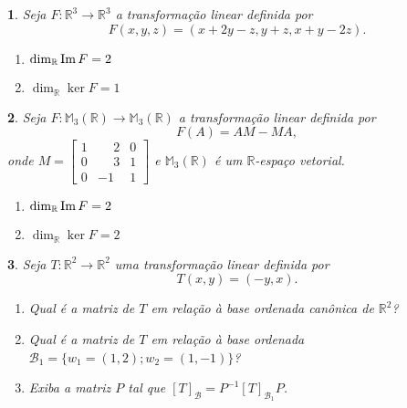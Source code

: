 \documentclass[12pt]{exam}
\newtheorem{exercicio}{}
\newcommand{\im}{{\rm Im\,}}
\newcommand{\real}{\mathbb{R}}
\newcommand{\cp}[1]{\mathbb{#1}}
\begin{document}
\begin{exercicio}
  Seja $F : \real^3 \to \real^3$ a transforma\c{c}\~ao linear definida por
  \[
    F(x,y,z) = (x + 2y - z, y + z, x + y - 2z).
  \]
  \begin{solucao}
    \begin{enumerate}[label=({\alph*})]
      \item $\dim_\real\im F = 2$
      \item $\dim_\real\ker F = 1$
    \end{enumerate}
  \end{solucao}
\end{exercicio}

\begin{exercicio}
  Seja $F : \cp{M}_3(\real) \to \cp{M}_3(\real)$ a transforma\c{c}\~ao linear definida por
  \[
    F(A) = AM - MA,
  \]
  onde $M = \begin{bmatrix}
    1 & \phantom{-}2 & 0\\0 & \phantom{-}3 & 1\\0 & -1 & 1
  \end{bmatrix}$ e $\cp{M}_3(\real)$ \'e um $\real$-espa\c{c}o vetorial.
  \begin{solucao}
    \begin{enumerate}[label=({\alph*})]
      \item $\dim_\real\im F = 2$
      \item $\dim_\real\ker F = 2$
    \end{enumerate}
  \end{solucao}
\end{exercicio}

\begin{exercicio}
  Seja $T : \real^2 \to \real^2$ uma transforma\c{c}\~ao linear definida por
  \[
    T(x,y) = (-y,x).
  \]
  \begin{enumerate}[label=({\alph*})]
    \item Qual \'e a matriz de $T$ em rela\c{c}\~ao \`a base ordenada can\^onica de $\real^2$?
    \item Qual \'e a matriz de $T$ em rela\c{c}\~ao \`a base ordenada $\mathcal{B}_1 = \{w_1 = (1,2); w_2 = (1,-1)\}$?
    \item Exiba a matriz $P$ tal que $[T]_{\mathcal{B}} = P^{-1}[T]_{\mathcal{B}_1}P$.
  \end{enumerate}
\end{exercicio}
\end{document}

